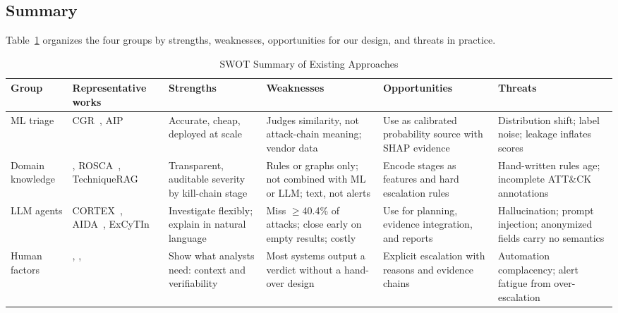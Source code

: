 \documentclass[conference]{IEEEtran}
\begin{document}
\subsection{Summary}
Table~\ref{tab:swot} organizes the four groups by strengths,
weaknesses, opportunities for our design, and threats in practice.

\begin{table}[t]
\caption{SWOT Summary of Existing Approaches}
\label{tab:swot}
\centering
\footnotesize
\setlength{\tabcolsep}{4pt}
\begin{tabular}{@{}p{2.0cm}p{2.2cm}p{2.9cm}p{3.1cm}p{3.1cm}p{3.0cm}@{}}
\toprule
\textbf{Group} & \textbf{Representative works} & \textbf{Strengths}
& \textbf{Weaknesses} & \textbf{Opportunities} & \textbf{Threats} \\
\midrule
ML triage & CGR~\cite{freitas2024cgr}, AIP~\cite{freitas2026aip}
& Accurate, cheap, deployed at scale
& Judges similarity, not attack-chain meaning; vendor data
& Use as calibrated probability source with SHAP evidence
& Distribution shift; label noise; leakage inflates scores~\cite{arp2022} \\
\addlinespace
Domain knowledge & \cite{sadlek2025}, ROSCA~\cite{garcia2025rosca}, TechniqueRAG~\cite{lekssays2025}
& Transparent, auditable severity by kill-chain stage
& Rules or graphs only; not combined with ML or LLM; text, not alerts
& Encode stages as features and hard escalation rules
& Hand-written rules age; incomplete ATT\&CK annotations \\
\addlinespace
LLM agents & CORTEX~\cite{wei2025cortex}, AIDA~\cite{tsegai2026}, ExCyTIn~\cite{wu2025excytin}
& Investigate flexibly; explain in natural language
& Miss $\geq$40.4\% of attacks; close early on empty results; costly
& Use for planning, evidence integration, and reports
& Hallucination; prompt injection; anonymized fields carry no semantics \\
\addlinespace
Human factors & \cite{tilbury2026}, \cite{kersten2025}, \cite{banstola2026}
& Show what analysts need: context and verifiability
& Most systems output a verdict without a hand-over design
& Explicit escalation with reasons and evidence chains
& Automation complacency; alert fatigue from over-escalation \\
\bottomrule
\end{tabular}
\end{table}

\end{document}
